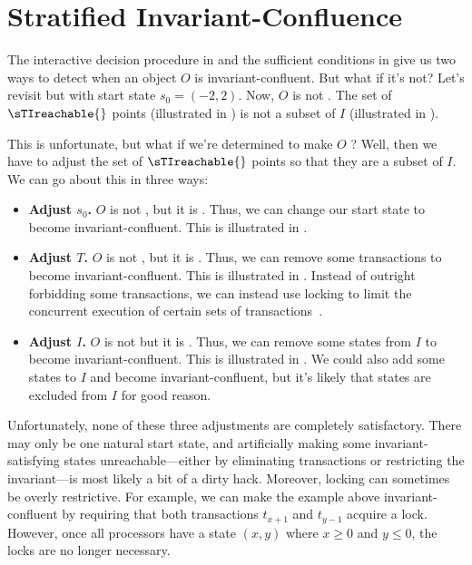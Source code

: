\section{Stratified Invariant-Confluence}
The interactive decision procedure in 
and the sufficient conditions in  give us two
ways to detect when an object $O$ is invariant-confluent. But what if it's not?
%
Let's revisit  but with start state $s_0 =
(-2, 2)$. Now, $O$ is not \sTIconfluent{}. The set of $\sTIreachable{}$ points
(illustrated in ) is not a subset of $I$
(illustrated in ).

This is unfortunate, but what if we're determined to make $O$ \sTIconfluent{}?
Well, then we have to adjust the set of $\sTIreachable{}$ points so that they
are a subset of $I$. We can go about this in three ways:
\begin{itemize}
  \item \textbf{Adjust $s_0$.}
    $O$ is not , but it is . Thus, we can change our start state to become
    invariant-confluent. This is illustrated in .

  \item \textbf{Adjust $T$.}
    $O$ is not , but it is
    . Thus, we can remove some transactions
    to become invariant-confluent. This is illustrated in
    . Instead of outright forbidding some
    transactions, we can instead use locking to limit the concurrent execution
    of certain sets of transactions~\cite{balegas2015putting,
    gotsman2016cause}.

  \item \textbf{Adjust $I$.}
    $O$ is not  but it is
    . Thus, we can
    remove some states from $I$ to become invariant-confluent. This is
    illustrated in . We could also add some states
    to $I$ and become invariant-confluent, but it's likely that states are
    excluded from $I$ for good reason.
\end{itemize}

{}

Unfortunately, none of these three adjustments are completely satisfactory.
There may only be one natural start state, and artificially making some
invariant-satisfying states unreachable---either by eliminating transactions or
restricting the invariant---is most likely a bit of a dirty hack. Moreover,
locking can sometimes be overly restrictive. For example, we can make the
example above invariant-confluent by requiring that both transactions $t_{x+1}$
and $t_{y-1}$ acquire a lock. However, once all processors have a state $(x,
y)$ where $x \geq 0$ and $y \leq 0$, the locks are no longer necessary.

